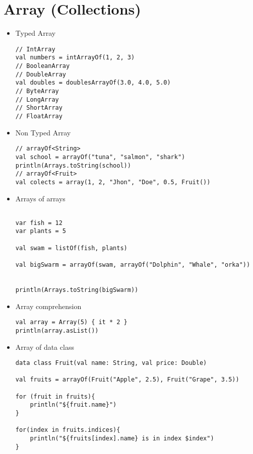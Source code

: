\documentclass[11pt]{article}
\begin{document}
\section*{Array (Collections)}
\label{sec:orgb3cc5f4}
\begin{itemize}
\item Typed Array
\begin{verbatim}
// IntArray
val numbers = intArrayOf(1, 2, 3)
// BooleanArray
// DoubleArray
val doubles = doublesArrayOf(3.0, 4.0, 5.0)
// ByteArray
// LongArray
// ShortArray
// FloatArray
\end{verbatim}

\item Non Typed Array
\begin{verbatim}
// arrayOf<String>
val school = arrayOf("tuna", "salmon", "shark")
println(Arrays.toString(school))
// arrayOf<Fruit>
val colects = array(1, 2, "Jhon", "Doe", 0.5, Fruit())
\end{verbatim}

\item Arrays of arrays
\begin{verbatim}

var fish = 12
var plants = 5

val swam = listOf(fish, plants)

val bigSwarm = arrayOf(swam, arrayOf("Dolphin", "Whale", "orka"))


println(Arrays.toString(bigSwarm))
\end{verbatim}

\item Array comprehension
\begin{verbatim}
val array = Array(5) { it * 2 }
println(array.asList())
\end{verbatim}

\item Array of data class
\begin{verbatim}
data class Fruit(val name: String, val price: Double)

val fruits = arrayOf(Fruit("Apple", 2.5), Fruit("Grape", 3.5))

for (fruit in fruits){
    println("${fruit.name}")
}

for(index in fruits.indices){
    println("${fruits[index].name} is in index $index")
}
\end{verbatim}
\end{itemize}
\end{document}
